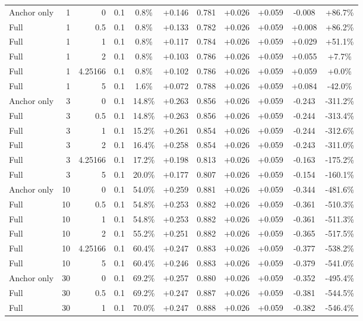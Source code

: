 \begin{table}[htbp]
\begin{tabular}{lrrrccccccc}
Anchor only & 1 & 0 & 0.1 & 0.8\% & +0.146 & 0.781 & +0.026 & +0.059 & -0.008 & +86.7\% \\
Full & 1 & 0.5 & 0.1 & 0.8\% & +0.133 & 0.782 & +0.026 & +0.059 & +0.008 & +86.2\% \\
Full & 1 & 1 & 0.1 & 0.8\% & +0.117 & 0.784 & +0.026 & +0.059 & +0.029 & +51.1\% \\
Full & 1 & 2 & 0.1 & 0.8\% & +0.103 & 0.786 & +0.026 & +0.059 & +0.055 & +7.7\% \\
Full & 1 & 4.25166 & 0.1 & 0.8\% & +0.102 & 0.786 & +0.026 & +0.059 & +0.059 & +0.0\% \\
Full & 1 & 5 & 0.1 & 1.6\% & +0.072 & 0.788 & +0.026 & +0.059 & +0.084 & -42.0\% \\
Anchor only & 3 & 0 & 0.1 & 14.8\% & +0.263 & 0.856 & +0.026 & +0.059 & -0.243 & -311.2\% \\
Full & 3 & 0.5 & 0.1 & 14.8\% & +0.263 & 0.856 & +0.026 & +0.059 & -0.244 & -313.4\% \\
Full & 3 & 1 & 0.1 & 15.2\% & +0.261 & 0.854 & +0.026 & +0.059 & -0.244 & -312.6\% \\
Full & 3 & 2 & 0.1 & 16.4\% & +0.258 & 0.854 & +0.026 & +0.059 & -0.243 & -311.0\% \\
Full & 3 & 4.25166 & 0.1 & 17.2\% & +0.198 & 0.813 & +0.026 & +0.059 & -0.163 & -175.2\% \\
Full & 3 & 5 & 0.1 & 20.0\% & +0.177 & 0.807 & +0.026 & +0.059 & -0.154 & -160.1\% \\
Anchor only & 10 & 0 & 0.1 & 54.0\% & +0.259 & 0.881 & +0.026 & +0.059 & -0.344 & -481.6\% \\
Full & 10 & 0.5 & 0.1 & 54.8\% & +0.253 & 0.882 & +0.026 & +0.059 & -0.361 & -510.3\% \\
Full & 10 & 1 & 0.1 & 54.8\% & +0.253 & 0.882 & +0.026 & +0.059 & -0.361 & -511.3\% \\
Full & 10 & 2 & 0.1 & 55.2\% & +0.251 & 0.882 & +0.026 & +0.059 & -0.365 & -517.5\% \\
Full & 10 & 4.25166 & 0.1 & 60.4\% & +0.247 & 0.883 & +0.026 & +0.059 & -0.377 & -538.2\% \\
Full & 10 & 5 & 0.1 & 60.4\% & +0.246 & 0.883 & +0.026 & +0.059 & -0.379 & -541.0\% \\
Anchor only & 30 & 0 & 0.1 & 69.2\% & +0.257 & 0.880 & +0.026 & +0.059 & -0.352 & -495.4\% \\
Full & 30 & 0.5 & 0.1 & 69.2\% & +0.247 & 0.887 & +0.026 & +0.059 & -0.381 & -544.5\% \\
Full & 30 & 1 & 0.1 & 70.0\% & +0.247 & 0.888 & +0.026 & +0.059 & -0.382 & -546.4\% \\

\end{tabular}
\end{table}
